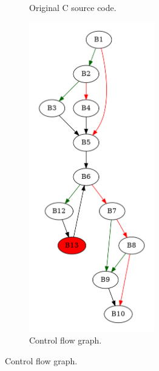 \begin{figure}[htbp]
	\centering
	\begin{subfigure}[b]{0.30\textwidth}
		\centering
		
		\caption{Original C source code.}
	\end{subfigure}
	\begin{subfigure}[b]{0.50\textwidth}
		\centering
		\includegraphics[width=0.6\textwidth]{inc/appendices/examples/hammock/counter-example/jump-threading-and-short-circuit/jump-threading-and-short-circuit_jump/f_0001b.png}
		\caption{Control flow graph.}
	\end{subfigure}
\end{figure}

